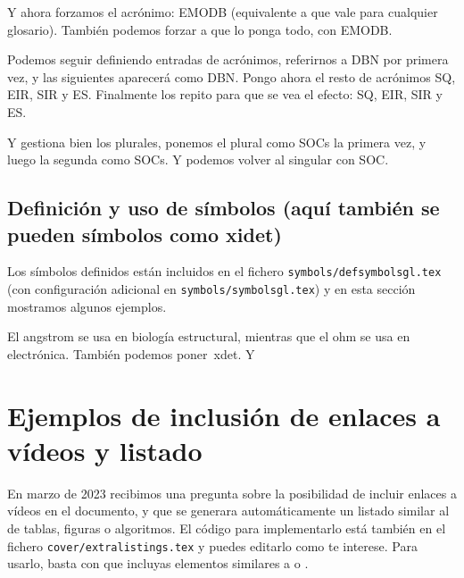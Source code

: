 \glsresetall[acronym]

Y ahora forzamos el acrónimo: \acs{EMODB} (equivalente a
 que vale para cualquier glosario). También podemos
forzar a que lo ponga todo, con \acf{EMODB}.


Podemos seguir definiendo entradas de acrónimos, referirnos a \ac{DBN}
por primera vez, y las siguientes aparecerá como \ac{DBN}.  Pongo ahora
el resto de acrónimos \ac{SQ}, \ac{EIR}, \ac{SIR} y
\ac{ES}. Finalmente los repito para que se vea el efecto: \ac{SQ},
\ac{EIR}, \ac{SIR} y \ac{ES}.

Y gestiona bien los plurales, ponemos el plural como \acp{SOC} la
primera vez, y luego la segunda como \acp{SOC}. Y podemos volver al
singular con \ac{SOC}.


\subsection{Definición y uso de símbolos (aquí también
  se pueden símbolos como \ac{xidet})}
\label{sec:simbolos}

Los símbolos definidos están incluidos en el fichero
\texttt{symbols/defsymbolsgl.tex} (con configuración adicional en
\texttt{symbols/symbolsgl.tex}) y en esta sección mostramos algunos
ejemplos.

El \ac{angstrom} se usa en biología estructural, mientras que el
\ac{ohm} se usa en electrónica. También podemos poner~\ac{xdet}. Y


\section{Ejemplos de inclusión de enlaces a vídeos y listado}
\label{sec:videolink}

En marzo de 2023 recibimos una pregunta sobre la posibilidad de incluir enlaces a vídeos en el documento, y que se generara automáticamente un listado similar al de tablas, figuras o algoritmos. El código para implementarlo está también en el fichero \texttt{cover/extralistings.tex} y puedes editarlo como te interese. Para usarlo, basta con que incluyas elementos similares a  o .




